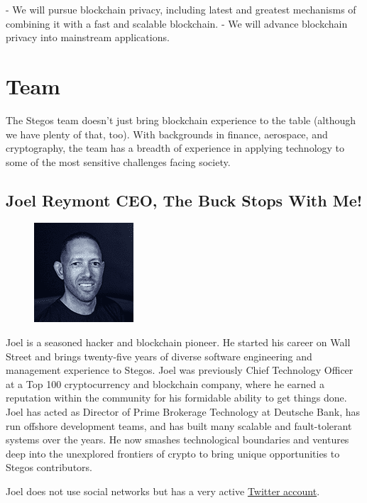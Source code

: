 \documentclass[8pt,fleqn,openany]{book}
\begin{document}
- We will pursue blockchain privacy, including latest and greatest mechanisms of combining it with a fast and scalable blockchain.
- We will advance blockchain privacy into mainstream applications.

\chapter{Team}\label{app:team}

The Stegos team doesn’t just bring blockchain experience to the table (although we have plenty of that, too). With backgrounds in finance, aerospace, and cryptography, the team has a breadth of experience in applying technology to some of the most sensitive challenges facing society.

\section{Joel Reymont CEO, The Buck Stops With Me!}

{
\setlength\intextsep{0pt}
\begin{figure}
	\includegraphics{images/team/team-1.png}
\end{figure}

Joel is a seasoned hacker and blockchain pioneer. He started his career on Wall Street and brings twenty-five years of diverse software engineering and management experience to Stegos. Joel was previously Chief Technology Officer at a Top 100 cryptocurrency and blockchain company, where he earned a reputation within the community for his formidable ability to get things done. Joel has acted as Director of Prime Brokerage Technology at Deutsche Bank, has run offshore development teams, and has built many scalable and fault-tolerant systems over the years. He now smashes technological boundaries and ventures deep into the unexplored frontiers of crypto to bring unique opportunities to Stegos contributors. 

Joel does not use social networks but has a very active \href{http://twitter.com/joelreymont}{Twitter account}.
}
\end{document}
